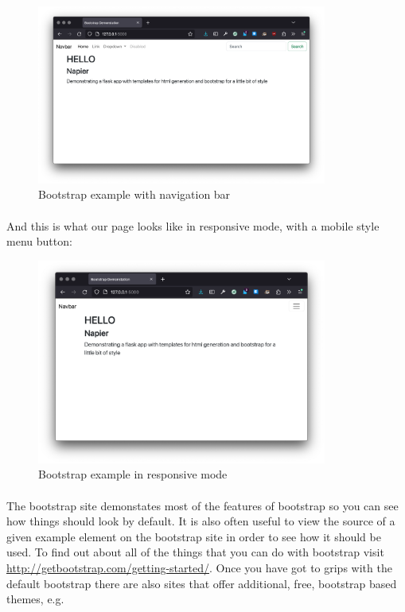 \documentclass[12pt, a4paper, oneside]{book}
\begin{document}
{\begin{figure}[H]
\centering
\includegraphics[width=0.85\textwidth]{images/bootstrap-template-expanded.png}
\caption{Bootstrap example with navigation bar}
\label{fig:bootstrap-example-expanded}
\end{figure}

\paragraph{} And this is what our page looks like in responsive mode, with a mobile style menu button:

\begin{figure}[H]
\centering
\includegraphics[width=0.85\textwidth]{images/bootstrap-template-responsive.png}
\caption{Bootstrap example in responsive mode}
\label{fig:bootstrap-example-responsive}
\end{figure}


\paragraph{} The bootstrap site demonstates most of the features of bootstrap so you can see how things should look by default. It is also often useful to view the source of a given example element on the bootstrap site in order to see how it should be used. To find out about all of the things that you can do with bootstrap visit \url{http://getbootstrap.com/getting-started/}. Once you have got to grips with the default bootstrap there are also sites that offer additional, free, bootstrap based themes, e.g.

}
\end{document}
